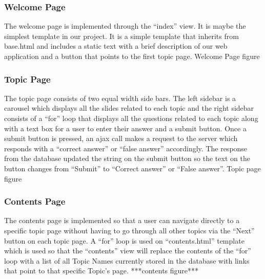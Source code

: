 \documentclass{l3proj}
\begin{document}
{\subsubsection{Welcome Page}
The welcome page is implemented through the “index” view.  It is maybe the simplest template in our project. It is a simple template that inherits from base.html and includes a static text with a brief description of our web application and a button that points to the first topic page.
Welcome Page figure

\subsubsection{Topic Page}
The topic page consists of two equal width side bars. The left sidebar is a carousel which displays all the slides related to each topic and the right sidebar  consists of a “for” loop that displays all the questions related to each topic along with a text box for a user to enter their answer and a submit button. Once a submit button is pressed, an ajax call makes a request to the server which responds with a “correct answer” or “false answer” accordingly.  The response from the database updated the string on the submit button so the text on the button changes from “Submit” to “Correct answer” or “False answer”.
Topic page figure

\subsubsection{Contents Page}
The contents page is implemented so that a user can navigate directly to a specific topic page without having to go through all other topics via the “Next” button on each topic page. A “for” loop is used on “contents.html” template which is used so that the “contents” view will replace the contents of the “for” loop with a list of all Topic Names currently stored in the database with links that point to that specific Topic’s page.
***contents figure***

}
\end{document}
